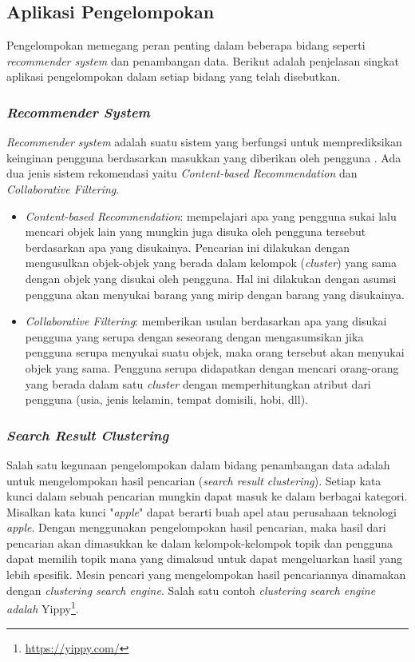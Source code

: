 \subsection{Aplikasi Pengelompokan}
Pengelompokan memegang peran penting dalam beberapa bidang seperti \textit{recommender system} dan penambangan data. Berikut adalah penjelasan singkat aplikasi pengelompokan dalam setiap bidang yang telah disebutkan.

\subsubsection{\textit{Recommender System}}
\textit{Recommender system} adalah suatu sistem yang berfungsi untuk memprediksikan keinginan pengguna berdasarkan masukkan yang diberikan oleh pengguna \cite{zhai2016text}. Ada dua jenis sistem rekomendasi yaitu \textit{Content-based Recommendation} dan \textit{Collaborative Filtering}.

\begin{itemize}
	\item \textit{Content-based Recommendation}: mempelajari apa yang pengguna sukai lalu mencari objek lain yang mungkin juga disuka oleh pengguna tersebut berdasarkan apa yang disukainya. Pencarian ini dilakukan dengan mengusulkan objek-objek yang berada dalam kelompok (\textit{cluster}) yang sama dengan objek yang disukai oleh pengguna. Hal ini dilakukan dengan asumsi pengguna akan menyukai barang yang mirip dengan barang yang disukainya.
	\item \textit{Collaborative Filtering}: memberikan usulan berdasarkan apa yang disukai pengguna yang serupa dengan seseorang dengan mengasumsikan jika pengguna serupa menyukai suatu objek, maka orang tersebut akan menyukai objek yang sama. Pengguna serupa didapatkan dengan mencari orang-orang yang berada dalam satu \textit{cluster} dengan memperhitungkan atribut dari pengguna (usia, jenis kelamin, tempat domisili, hobi, dll).
\end{itemize}


\subsubsection{\textit{Search Result Clustering}}
Salah satu kegunaan pengelompokan dalam bidang penambangan data adalah untuk mengelompokan hasil pencarian (\textit{search result clustering})\cite{mecca2007new}. Setiap kata kunci dalam sebuah pencarian mungkin dapat masuk ke dalam berbagai kategori. Misalkan kata kunci "\textit{apple}" dapat berarti buah apel atau perusahaan teknologi \textit{apple}. Dengan menggunakan pengelompokan hasil pencarian, maka hasil dari pencarian akan dimasukkan ke dalam kelompok-kelompok topik dan pengguna dapat memilih topik mana yang dimaksud untuk dapat mengeluarkan hasil yang lebih spesifik. Mesin pencari yang mengelompokan hasil pencariannya dinamakan dengan \textit{clustering search engine}. Salah satu contoh \textit{clustering search engine adalah} Yippy\footnote{\href{https://yippy.com/}{https://yippy.com/}}. 

